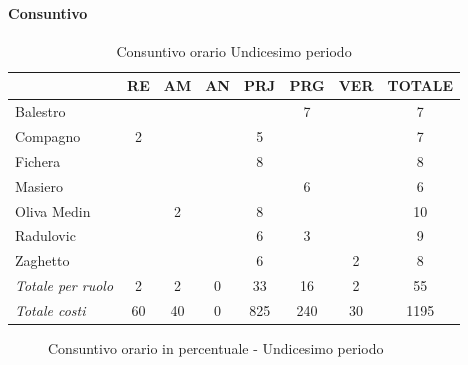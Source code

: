\documentclass[a4paper,12pt]{article}
\begin{document}
            \paragraph{Consuntivo}
                \begin{table}[H]
                \centering
                \caption{Consuntivo orario Undicesimo periodo}
                \begin{tabular}{|l|c|c|c|c|c|c|c|}
                \hline
                    \rowcolor{lightgray}{\textbf{Membro}} & {\textbf{RE}} & {\textbf{AM}} & {\textbf{AN}} & {\textbf{PRJ}} & {\textbf{PRG}} & {\textbf{VER}} & {\textbf{TOTALE}}\\
                \hline
                    Balestro & & & & & 7 & & 7\\
                \hline
                    Compagno & 2 & & & 5 & & & 7\\
                \hline
                    Fichera & & & & 8 & & & 8\\
                \hline
                    Masiero & & & & & 6 & & 6\\
                \hline
                    Oliva Medin & & 2 & & 8 & & & 10\\
                \hline
                    Radulovic & & & & 6 & 3 & & 9\\
                \hline
                    Zaghetto & & & & 6 & & 2 & 8\\
                \hline
                    \rowcolor{lightgray}\textit{Totale per ruolo} & 2 & 2 & 0 & 33 & 16 & 2 & 55\\
                \hline
                    \rowcolor{lightgray}\textit{Totale costi} & 60 & 40 & 0 & 825 & 240 & 30 & 1195\\
                \hline
                \end{tabular}
                \end{table}

                \begin{figure}[H]
                \centering
                \caption{Consuntivo orario in percentuale - Undicesimo periodo}
                \end{figure}
                
\end{document}
